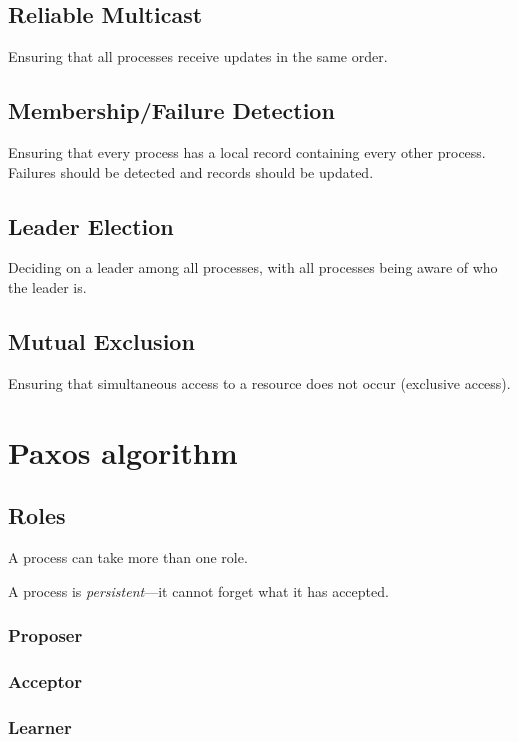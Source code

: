 \documentclass[12pt, a4paper]{article}
\begin{document}
\subsection{Reliable Multicast}

Ensuring that all processes receive updates in the same order.

\subsection{Membership/Failure Detection}

Ensuring that every process has a local record containing every other process.
Failures should be detected and records should be updated.

\subsection{Leader Election}

Deciding on a leader among all processes, with all processes being aware of
who the leader is.

\subsection{Mutual Exclusion}

Ensuring that simultaneous access to a resource does not occur (exclusive
access).


\section{Paxos algorithm}

\subsection{Roles}

A process can take more than one role.

A process is \textit{persistent}---it cannot forget what it has accepted.

  \subsubsection{Proposer}

  \subsubsection{Acceptor}

  \subsubsection{Learner}
\end{document}

